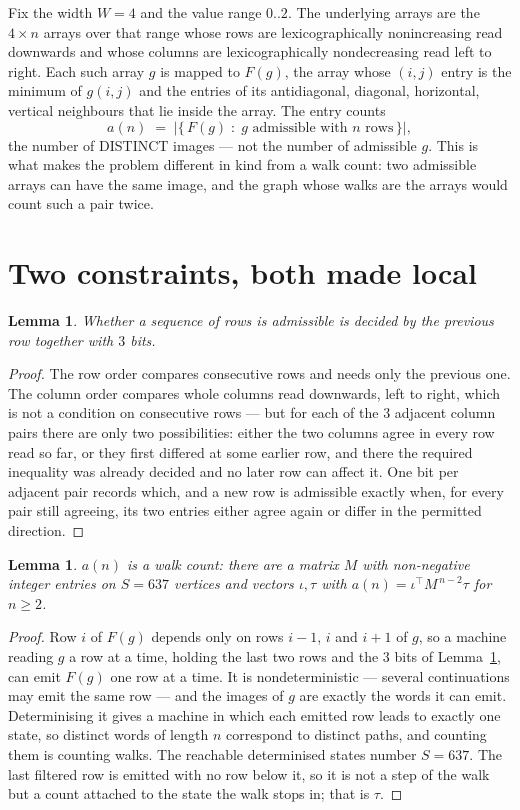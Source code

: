 \documentclass[11pt,a4paper]{article}
\theoremstyle{plain}
\newtheorem{lemma}[theorem]{Lemma}
\theoremstyle{definition}
\begin{document}
Fix the width $W=4$ and the value range $0..2$. The underlying arrays are the
$4\times n$ arrays over that range whose rows are lexicographically nonincreasing read downwards
and whose columns are lexicographically nondecreasing read left to right. Each such array $g$
is mapped to $F(g)$, the array whose $(i,j)$ entry is the minimum of $g(i,j)$ and the entries
of its antidiagonal, diagonal, horizontal, vertical neighbours that lie inside the array. The entry counts
\[
a(n)\;=\;\bigl|\{\,F(g)\;:\;g\text{ admissible with }n\text{ rows}\,\}\bigr|,
\]
the number of DISTINCT images --- not the number of admissible $g$. This is what makes the
problem different in kind from a walk count: two admissible arrays can have the same image, and
the graph whose walks are the arrays would count such a pair twice.

\section{Two constraints, both made local}

\begin{lemma}\label{lem:local}
Whether a sequence of rows is admissible is decided by the previous row together with
$3$ bits.
\end{lemma}

\begin{proof}
The row order compares consecutive rows and needs only the previous one. The column order
compares whole columns read downwards, left to right, which is not a condition on consecutive
rows --- but for each of the $3$ adjacent column pairs there are only two possibilities:
either the two columns agree in every row read so far, or they first differed at some earlier
row, and there the required inequality was already decided and no later row can affect it. One
bit per adjacent pair records which, and a new row is admissible exactly when, for every pair
still agreeing, its two entries either agree again or differ in the permitted direction.
\end{proof}

\begin{lemma}\label{lem:det}
$a(n)$ is a walk count: there are a matrix $M$ with non-negative integer entries on $S=637$
vertices and vectors $\iota,\tau$ with $a(n)=\iota^{\!\top}M^{\,n-2}\tau$ for $n\ge2$.
\end{lemma}

\begin{proof}
Row $i$ of $F(g)$ depends only on rows $i-1$, $i$ and $i+1$ of $g$, so a machine reading $g$ a
row at a time, holding the last two rows and the $3$ bits of Lemma~\ref{lem:local}, can
emit $F(g)$ one row at a time. It is nondeterministic --- several continuations may emit the
same row --- and the images of $g$ are exactly the words it can emit. Determinising it gives a
machine in which each emitted row leads to exactly one state, so distinct words of length $n$
correspond to distinct paths, and counting them is counting walks. The reachable determinised
states number $S=637$. The last filtered row is emitted with no row below it, so it is not a
step of the walk but a count attached to the state the walk stops in; that is $\tau$.
\end{proof}
\end{document}
